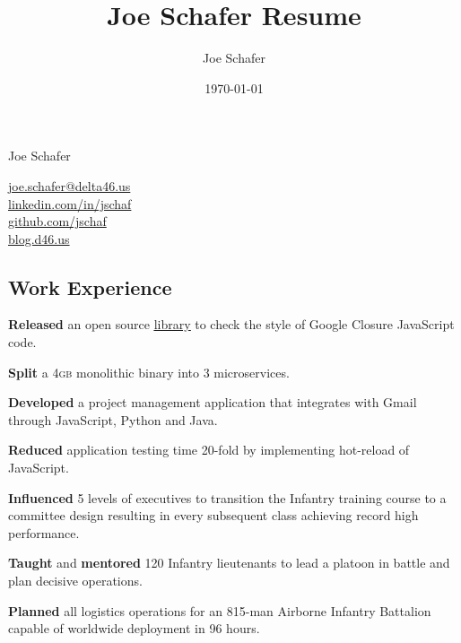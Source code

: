 \documentclass[letterpaper,11pt]{jschaf-resume}
\title{Joe Schafer Resume}
\author{Joe Schafer}
\date{\today}
\makeatletter
\newcommand*{\emailLink}{\href{mailto:joe.schafer@delta46.us}{joe.schafer@delta46.us}}
\newcommand*{\linkedInLink}{\href{http://linkedin.com/in/jschaf}{linkedin.com/in/jschaf}}
\newcommand*{\githubLink}{\href{http://github.com/jschaf}{github.com/jschaf}}
\newcommand*{\blogLink}{\href{http://blog.d46.us}{blog.d46.us}}
\newcommand*{\action}[1]{\textbf{#1}}
\newcommand*{\GB}{\textsc{gb}}
\makeatother
\begin{document}

\setlength{\columnsep}{3em}

\begin{paracol}{2}
{\fontsize{36px}{48px}\selectfont Joe Schafer}

\switchcolumn
{\fontfamily\sfdefault\selectfont
\emailLink\\
\linkedInLink\\
\githubLink\\
\blogLink\\
}
\end{paracol}


\begin{paracol}{2}
\section*{Work Experience}

\vspace{-12pt}
\begin{workitems}
\item \action{Released} an open source
  \href{https://github.com/google/eslint-closure}{\ul{library}} to check the
  style of Google Closure JavaScript code.
\item \action{Split} a 4\GB{} monolithic binary into 3 microservices.
\item \action{Developed} a project management application that integrates with Gmail
  through JavaScript, Python and Java.
\item \action{Reduced} application testing time 20-fold by implementing hot-reload of JavaScript.
\end{workitems}

\begin{workitems}
\item \action{Influenced} 5 levels of executives to transition the Infantry
  training course to a committee design resulting in every subsequent class
  achieving record high performance.
\item \action{Taught} and \action{mentored} 120 Infantry lieutenants to lead a
  platoon in battle and plan decisive operations.
\end{workitems}

\begin{workitems}
\item \action{Planned} all logistics operations for an 815-man Airborne Infantry
  Battalion capable of worldwide deployment in 96 hours.


\end{workitems}
\end{paracol}
\end{document}
